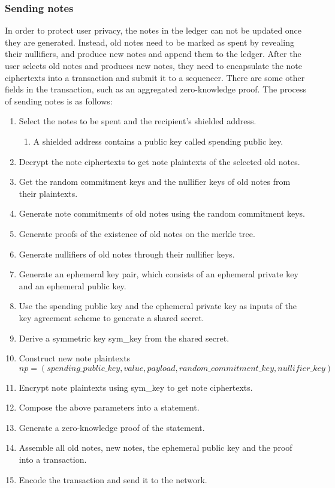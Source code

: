 \subsubsection{Sending notes}\label{section: sending-notes}

In order to protect user privacy, the notes in the ledger can not be updated once they are generated. Instead, old notes need to be marked as spent by revealing their nullifiers, and produce new notes and append them to the ledger.
After the user selects old notes and produces new notes, they need to encapsulate the note ciphertexts into a transaction and submit it to a sequencer. There are some other fields in the transaction, such as an aggregated zero-knowledge proof. The process of sending notes is as follows:

\begin{enumerate}
    \item Select the notes to be spent and the recipient's shielded address.
    \begin{enumerate}
        \item A shielded address contains a public key called spending public key.
    \end{enumerate}
    \item Decrypt the note ciphertexts to get note plaintexts of the selected old notes.
    \item Get the random commitment keys and the nullifier keys of old notes from their plaintexts.
    \item Generate note commitments of old notes using the random commitment keys.
    \item Generate proofs of the existence of old notes on the merkle tree.
    \item Generate nullifiers of old notes through their nullifier keys.
    \item Generate an ephemeral key pair, which consists of an ephemeral private key and an ephemeral public key.
    \item Use the spending public key and the ephemeral private key as inputs of the key agreement scheme to generate a shared secret.
    \item Derive a symmetric key sym\_key from the shared secret.
    \item Construct new note plaintexts $$np = (spending\_public\_key, value, payload, random\_commitment\_key, nullifier\_key)$$
    \item Encrypt note plaintexts using sym\_key to get note ciphertexts.
    \item Compose the above parameters into a statement.
    \item Generate a zero-knowledge proof of the statement.
    \item Assemble all old notes, new notes, the ephemeral public key and the proof into a transaction.
    \item Encode the transaction and send it to the network.
\end{enumerate}